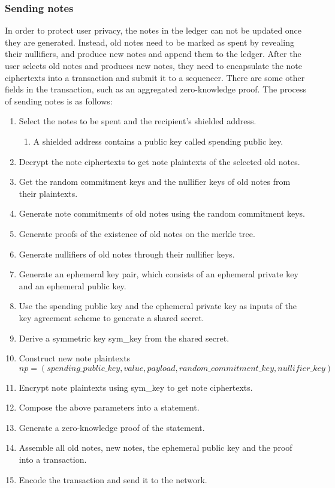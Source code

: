 \subsubsection{Sending notes}\label{section: sending-notes}

In order to protect user privacy, the notes in the ledger can not be updated once they are generated. Instead, old notes need to be marked as spent by revealing their nullifiers, and produce new notes and append them to the ledger.
After the user selects old notes and produces new notes, they need to encapsulate the note ciphertexts into a transaction and submit it to a sequencer. There are some other fields in the transaction, such as an aggregated zero-knowledge proof. The process of sending notes is as follows:

\begin{enumerate}
    \item Select the notes to be spent and the recipient's shielded address.
    \begin{enumerate}
        \item A shielded address contains a public key called spending public key.
    \end{enumerate}
    \item Decrypt the note ciphertexts to get note plaintexts of the selected old notes.
    \item Get the random commitment keys and the nullifier keys of old notes from their plaintexts.
    \item Generate note commitments of old notes using the random commitment keys.
    \item Generate proofs of the existence of old notes on the merkle tree.
    \item Generate nullifiers of old notes through their nullifier keys.
    \item Generate an ephemeral key pair, which consists of an ephemeral private key and an ephemeral public key.
    \item Use the spending public key and the ephemeral private key as inputs of the key agreement scheme to generate a shared secret.
    \item Derive a symmetric key sym\_key from the shared secret.
    \item Construct new note plaintexts $$np = (spending\_public\_key, value, payload, random\_commitment\_key, nullifier\_key)$$
    \item Encrypt note plaintexts using sym\_key to get note ciphertexts.
    \item Compose the above parameters into a statement.
    \item Generate a zero-knowledge proof of the statement.
    \item Assemble all old notes, new notes, the ephemeral public key and the proof into a transaction.
    \item Encode the transaction and send it to the network.
\end{enumerate}